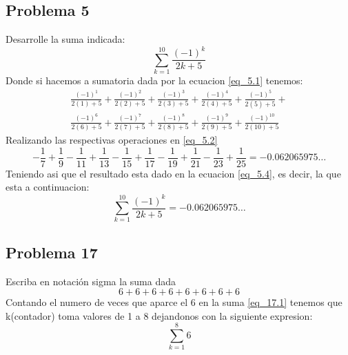 \documentclass{article}
\begin{document}
      \subsection{Problema 5}
        Desarrolle la suma indicada:
       \begin{equation}\label{eq_5.1}
        \sum_{k=1}^{10}\frac{(-1)^k}{2k+5}
       \end{equation}
       Donde si hacemos a sumatoria dada por la ecuacion \ref{eq_5.1} tenemos:
       \begin{equation}\label{eq_5.2}
        \begin{split}
          \frac{(-1)^1}{2(1)+5}+\frac{(-1)^2}{2(2)+5}+\frac{(-1)^3}{2(3)+5}+\frac{(-1)^4}{2(4)+5}+\frac{(-1)^5}{2(5)+5}+\\\frac{(-1)^6}{2(6)+5}+\frac{(-1)^7}{2(7)+5}+\frac{(-1)^8}{2(8)+5}+\frac{(-1)^9}{2(9)+5}+\frac{(-1)^{10}}{2(10)+5}
        \end{split}
       \end{equation}
       Realizando las respectivas operaciones en \ref{eq_5.2}
       \begin{equation}\label{eq_5.3}
          -\frac{1}{7}+\frac{1}{9}-\frac{1}{11}+\frac{1}{13}-\frac{1}{15}+\frac{1}{17}-\frac{1}{19}+\frac{1}{21}-\frac{1}{23}+\frac{1}{25} = -0.062065975\dots
       \end{equation}
       Teniendo asi que el resultado esta dado en la ecuacion \ref{eq_5.4}, es decir, la que esta a continuacion: 
       \begin{equation}\label{eq_5.4}
        \sum_{k=1}^{10}\frac{(-1)^k}{2k+5} = -0.062065975\dots
       \end{equation}
      \subsection{Problema 17}
       Escriba en notación sigma la suma dada
       \setcounter{equation}{0}
       \begin{equation}\label{eq_17.1}
        6+6+6+6+6+6+6+6
       \end{equation}
       Contando el numero de veces que aparce el 6 en la suma \ref{eq_17.1} tenemos que k(contador) toma valores de 1 a 8 dejandonos con la siguiente expresion:
       \begin{equation}\label{eq_17.2}
        \sum_{k=1}^{8}6
       \end{equation}
       \setcounter{equation}{0}
\end{document}
